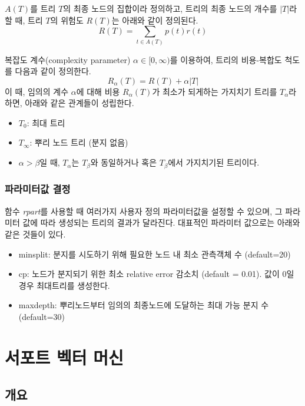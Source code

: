 \documentclass[
]{book}
\providecommand{\tightlist}{%
  \setlength{\itemsep}{0pt}\setlength{\parskip}{0pt}}
\begin{document}
\(A(T)\)를 트리 \(T\)의 최종 노드의 집합이라 정의하고, 트리의 최종 노드의 개수를 \(|T|\)라 할 때, 트리 \(T\)의 위험도 \(R(T)\)는 아래와 같이 정의된다.
\[R(T) = \sum_{t \in A(T)} p(t)r(t)\]

복잡도 계수(complexity parameter) \(\alpha \in [0, \infty)\)를 이용하여, 트리의 비용-복합도 척도를 다음과 같이 정의한다.
\[R_\alpha(T) = R(T) + \alpha|T|\]
이 때, 임의의 계수 \(\alpha\)에 대해 비용 \(R_\alpha(T)\)가 최소가 되게하는 가지치기 트리를 \(T_\alpha\)라 하면, 아래와 같은 관계들이 성립한다.

\begin{itemize}
\tightlist
\item
  \(T_0\): 최대 트리
\item
  \(T_\infty\): 뿌리 노드 트리 (분지 없음)
\item
  \(\alpha > \beta\)일 때, \(T_\alpha\)는 \(T_\beta\)와 동일하거나 혹은 \(T_\beta\)에서 가지치기된 트리이다.
\end{itemize}

\hypertarget{cart-r-pkg-param}{%
\subsection{파라미터값 결정}\label{cart-r-pkg-param}}

함수 \emph{rpart}를 사용할 때 여러가지 사용자 정의 파라미터값을 설정할 수 있으며, 그 파라미터 값에 따라 생성되는 트리의 결과가 달라진다. 대표적인 파라미터 값으로는 아래와 같은 것들이 있다.

\begin{itemize}
\tightlist
\item
  minsplit: 분지를 시도하기 위해 필요한 노드 내 최소 관측객체 수 (default=20)
\item
  cp: 노드가 분지되기 위한 최소 relative error 감소치 (default = 0.01). 값이 0일 경우 최대트리를 생성한다.
\item
  maxdepth: 뿌리노드부터 임의의 최종노드에 도달하는 최대 가능 분지 수 (default=30)
\end{itemize}

\hypertarget{svm}{%
\chapter{서포트 벡터 머신}\label{svm}}

\hypertarget{svm-overview}{%
\section{개요}\label{svm-overview}}
\end{document}
